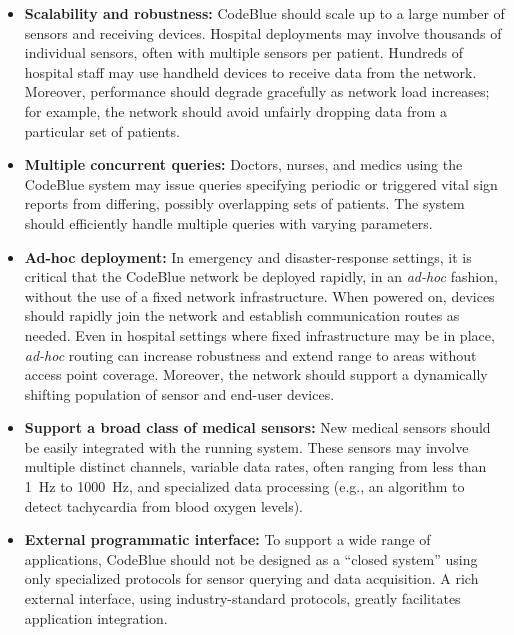 \begin{itemize}
\item {\bf Scalability and robustness:} 
CodeBlue should scale up to a large 
number of sensors and receiving devices. Hospital deployments may
involve thousands of individual sensors, often with multiple sensors
per patient. Hundreds of hospital staff may use handheld devices to
receive data from the network. Moreover, performance should degrade
gracefully as network load increases; for example, the network should 
avoid unfairly dropping data from a particular set of patients. 

\item
{\bf Multiple concurrent queries:} Doctors, nurses, and medics using
the CodeBlue system may issue queries specifying periodic or triggered
vital sign reports from differing, possibly overlapping sets of
patients. The system should efficiently handle multiple queries with
varying parameters.

\item
{\bf Ad-hoc deployment:} In emergency and disaster-response settings,
it is critical that the CodeBlue network be deployed rapidly, in an
{\em ad-hoc} fashion, without the use of a fixed network
infrastructure.  When powered on, devices should rapidly join the
network and establish communication routes as needed. Even in hospital
settings where fixed infrastructure may be in place, {\em ad-hoc}
routing can increase robustness and extend range to areas without
access point coverage.  Moreover, the network should support a
dynamically shifting population of sensor and end-user devices.

\item
{\bf Support a broad class of medical sensors:} New medical sensors
should be easily integrated with the running system.  These sensors
may involve multiple distinct channels, variable data rates, often
ranging from less than 1~Hz to 1000~Hz, and specialized data
processing (e.g., an algorithm to detect tachycardia from blood oxygen
levels).


\item
{\bf External programmatic interface:} To support a wide range of
applications, CodeBlue should not be designed as a ``closed system''
using only specialized protocols for sensor querying and data
acquisition. A rich external interface, using industry-standard
protocols, greatly facilitates application integration.

\end{itemize}

